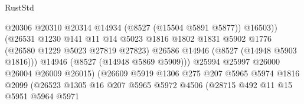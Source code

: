 \begin{lexlean}{RustStd}
\begin{coremodule}
                                              @20306
                                              @20310
                                              @20314
                                              @14934
                                              (@8527 (@15504 @5891 @5877))
                                              @16503))
                                          (@26531
                                            @1230
                                            @141
                                            @11
                                            @14
                                            @5023
                                            @1816
                                            @1802
                                            @1831
                                            @5902
                                            @1776
                                            (@26580 @1229 @5023 @27819 @27823)
                                            @26586
                                            @14946
                                            (@8527 (@14948 @5903 @1816)))
                                          @14946
                                          (@8527 (@14948 @5869 @5909)))
                                        @25994
                                        @25997
                                        @26000
                                        @26004
                                        @26009
                                        @26015)
                                      (@26609
                                        @5919
                                        @1306
                                        @275
                                        @207
                                        @5965
                                        @5974
                                        @1816
                                        @2099
                                        (@26523
                                          @1305
                                          @16
                                          @207
                                          @5965
                                          @5972
                                          @4506
                                          (@28715
                                            @492
                                            @11
                                            @15
                                            @5951
                                            @5964
                                            @5971

\end{coremodule}
\end{lexlean}
